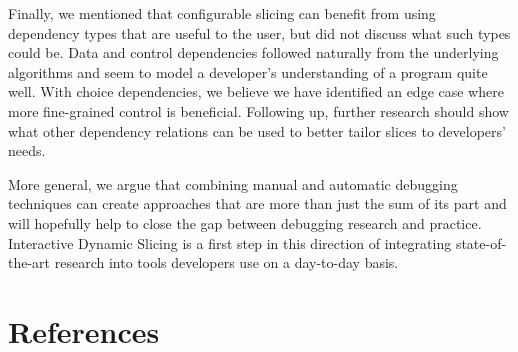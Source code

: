 \documentclass[
			english,
			]{elsarticle}
\begin{document}
Finally, we mentioned that configurable slicing can benefit from using dependency types that are useful to the user, but did not discuss what such types could be.
Data and control dependencies followed naturally from the underlying algorithms and seem to model a developer's understanding of a program quite well.
With choice dependencies, we believe we have identified an edge case where more fine-grained control is beneficial.
Following up, further research should show what other dependency relations can be used to better tailor slices to developers' needs.

More general, we argue that combining manual and automatic debugging techniques can create approaches that are more than just the sum of its part and will hopefully help to close the gap between debugging research and practice.
Interactive Dynamic Slicing is a first step in this direction of integrating state-of-the-art research into tools developers use on a day-to-day basis.


%


\section*{References}

\end{document}
